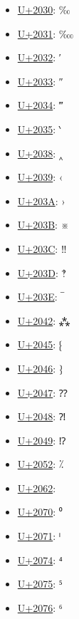 \begin{itemize}
	\item \href{https://decodeunicode.org/en/u+2030}{U+2030}: ‰
	\item \href{https://decodeunicode.org/en/u+2031}{U+2031}: ‱
	\item \href{https://decodeunicode.org/en/u+2032}{U+2032}: ′
	\item \href{https://decodeunicode.org/en/u+2033}{U+2033}: ″
	\item \href{https://decodeunicode.org/en/u+2034}{U+2034}: ‴
	\item \href{https://decodeunicode.org/en/u+2035}{U+2035}: ‵
	\item \href{https://decodeunicode.org/en/u+2038}{U+2038}: ‸
	\item \href{https://decodeunicode.org/en/u+2039}{U+2039}: ‹
	\item \href{https://decodeunicode.org/en/u+203A}{U+203A}: ›
	\item \href{https://decodeunicode.org/en/u+203B}{U+203B}: ※
	\item \href{https://decodeunicode.org/en/u+203C}{U+203C}: ‼
	\item \href{https://decodeunicode.org/en/u+203D}{U+203D}: ‽
	\item \href{https://decodeunicode.org/en/u+203E}{U+203E}: ‾
	\item \href{https://decodeunicode.org/en/u+2042}{U+2042}: ⁂
	\item \href{https://decodeunicode.org/en/u+2045}{U+2045}: ⁅
	\item \href{https://decodeunicode.org/en/u+2046}{U+2046}: ⁆
	\item \href{https://decodeunicode.org/en/u+2047}{U+2047}: ⁇
	\item \href{https://decodeunicode.org/en/u+2048}{U+2048}: ⁈
	\item \href{https://decodeunicode.org/en/u+2049}{U+2049}: ⁉
	\item \href{https://decodeunicode.org/en/u+2052}{U+2052}: ⁒
	\item \href{https://decodeunicode.org/en/u+2062}{U+2062}: ⁢
	\item \href{https://decodeunicode.org/en/u+2070}{U+2070}: ⁰
	\item \href{https://decodeunicode.org/en/u+2071}{U+2071}: ⁱ
	\item \href{https://decodeunicode.org/en/u+2074}{U+2074}: ⁴
	\item \href{https://decodeunicode.org/en/u+2075}{U+2075}: ⁵
	\item \href{https://decodeunicode.org/en/u+2076}{U+2076}: ⁶

\end{itemize}
